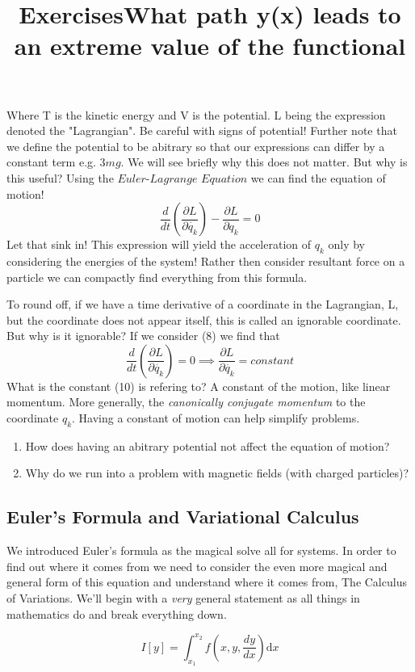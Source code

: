 Where T is the kinetic energy and V is the potential. L being the expression denoted the "Lagrangian". Be careful with signs of potential! Further note that we define the potential to be abitrary so that our expressions can differ by a constant term e.g. $3mg$. We will see briefly why this does not matter. But why is this useful? Using the $\textit{Euler-Lagrange Equation}$ we can find the equation of motion! 
\begin{equation}
\frac{d}{dt} (\frac{\partial L}{\partial \dot{q_{k}}}) - \frac{\partial L}{\partial q_{k}} = 0
\end{equation}
Let that sink in! This expression will yield the acceleration of $q_{k}$ only by considering the energies of the system! Rather then consider resultant force on a particle we can compactly find everything from this formula. \par 
To round off, if we have a time derivative of a coordinate in the Lagrangian, L, but the coordinate does not appear itself, this is called an ignorable coordinate. But why is it ignorable? If we consider (8) we find that 
\begin{equation}
\frac{d}{dt} (\frac{\partial L}{\partial \dot{q_{k}}}) = 0 \implies \frac{\partial L}{\partial \dot{q_{k}}} = constant
\end{equation}
What is the constant (10) is refering to? A constant of the motion, like linear momentum. More generally, the \textit{canonically conjugate momentum} to the coordinate $q_{k}$. Having a constant of motion can help simplify problems.
\par \vfill
\title{\large{Exercises}}
\begin{enumerate}
	\item How does having an abitrary potential not affect the equation of motion? 
	\item Why do we run into a problem with magnetic fields (with charged particles)? 
\end{enumerate}

\subsection{Euler's Formula and Variational Calculus}
We introduced Euler's formula as the magical solve all for systems. In order to find out where it comes from we need to consider the even more magical and general form of this equation and understand where it comes from, The Calculus of Variations. We'll begin with a \textit{very} general statement as all things in mathematics do and break everything down.
\title{What path y(x) leads to an extreme value of the functional}
\begin{equation}
I[y] = \int_{x_{1}}^{x_{2}} \! f(x, y, \frac{dy}{dx}) \textrm{d}x
\end{equation}

